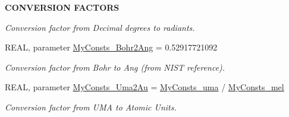 \begin{Indent}{\bf CONVERSION FACTORS}
\begin{DoxyCompactItemize}
\begin{DoxyCompactList}\small\item\em Conversion factor from Decimal degrees to radiants. \item\end{DoxyCompactList}\item 
REAL, parameter \hyperlink{namespace_my_consts_a5fc835991a4a417c2bdf1226c1ba2b3a}{MyConsts\_\-Bohr2Ang} = 0.52917721092
\begin{DoxyCompactList}\small\item\em Conversion factor from Bohr to Ang (from NIST reference). \item\end{DoxyCompactList}\item 
REAL, parameter \hyperlink{namespace_my_consts_a36b4ba1dfa259ff5c9eaec55eb5f977f}{MyConsts\_\-Uma2Au} = \hyperlink{namespace_my_consts_a3b04681501dc44eeb3701aa7ee2f220e}{MyConsts\_\-uma} / \hyperlink{namespace_my_consts_aa1367128efaba1f65ead2ceb9f64db46}{MyConsts\_\-mel}
\begin{DoxyCompactList}\small\item\em Conversion factor from UMA to Atomic Units. \item\end{DoxyCompactList}\end{DoxyCompactItemize}
\end{Indent}
